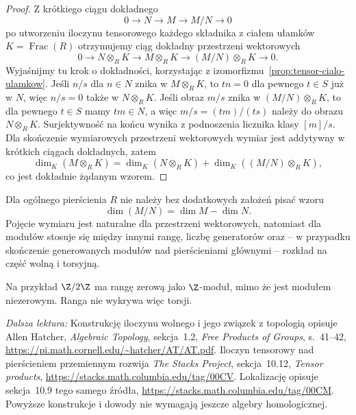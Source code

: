 \begin{proof}
Z krótkiego ciągu dokładnego
\[
0\longrightarrow N
\longrightarrow M
\longrightarrow M/N
\longrightarrow0
\]
po utworzeniu iloczynu tensorowego każdego składnika
z ciałem ułamków $K=\operatorname{Frac}(R)$
otrzymujemy ciąg dokładny przestrzeni wektorowych
\[
0
\longrightarrow
N\otimes_R K
\longrightarrow
M\otimes_R K
\longrightarrow
(M/N)\otimes_R K
\longrightarrow0.
\]
Wyjaśnijmy tu krok o dokładności, korzystając z
izomorfizmu~\ref{prop:tensor-cialo-ulamkow}. Jeśli $n/s$
dla $n\in N$ znika w $M\otimes_R K$, to $tn=0$
dla pewnego $t\in S$ już w $N$, więc $n/s=0$ także
w $N\otimes_R K$. Jeśli obraz $m/s$ znika w
$(M/N)\otimes_R K$, to dla pewnego $t\in S$ mamy
$tm\in N$, a więc $m/s=(tm)/(ts)$ należy do obrazu
$N\otimes_R K$. Surjektywność na końcu wynika z
podnoszenia licznika klasy $[m]/s$.
Dla skończenie wymiarowych przestrzeni wektorowych wymiar jest
addytywny w krótkich ciągach dokładnych, zatem
\[
\dim_K(M\otimes_R K)
=
\dim_K(N\otimes_R K)
+
\dim_K((M/N)\otimes_R K),
\]
co jest dokładnie żądanym wzorem.
\end{proof}

\begin{uwaga}
Dla ogólnego pierścienia $R$ nie należy bez dodatkowych założeń
pisać wzoru
\[
\dim(M/N)=\dim M-\dim N.
\]
Pojęcie wymiaru jest naturalne dla przestrzeni wektorowych, natomiast
dla modułów stosuje się między innymi rangę, liczbę generatorów
oraz -- w przypadku skończenie generowanych modułów nad
pierścieniami głównymi -- rozkład
na część wolną i torsyjną.

Na przykład $\Z/2\Z$ ma rangę zerową jako $\Z$-moduł,
mimo że jest modułem niezerowym. Ranga nie wykrywa więc torsji.
\end{uwaga}

\par\smallskip
{\footnotesize\noindent\emph{Dalsza lektura:}
Konstrukcję iloczynu wolnego i jego związek z topologią opisuje
Allen Hatcher, \emph{Algebraic Topology}, sekcja~1.2,
\emph{Free Products of Groups}, s.~41--42,
\url{https://pi.math.cornell.edu/~hatcher/AT/AT.pdf}.
Iloczyn tensorowy nad pierścieniem przemiennym rozwija
\emph{The Stacks Project}, sekcja~10.12, \emph{Tensor products},
\url{https://stacks.math.columbia.edu/tag/00CV}.
Lokalizację opisuje sekcja~10.9 tego samego źródła,
\url{https://stacks.math.columbia.edu/tag/00CM}.
Powyższe konstrukcje i dowody nie wymagają jeszcze algebry homologicznej.\par}
